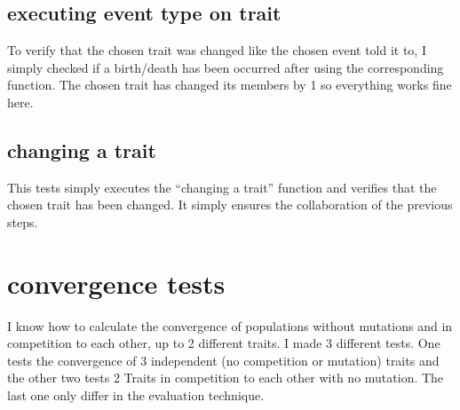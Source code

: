 \documentclass{article}
\begin{document}
\subsection{executing event type on trait}
To verify that the chosen trait was changed like the chosen event told it to, I simply checked if a birth/death has been occurred after using the corresponding function. The chosen trait has changed its members by 1 so everything works fine here.

\subsection{changing a trait}
This tests simply executes the "`changing a trait"' function and verifies that the chosen trait has been changed. It simply ensures the collaboration of the previous steps.

\section{convergence tests}
I know how to calculate the convergence of populations without mutations and in competition to each other, up to 2 different traits. I made 3 different tests. One tests the convergence of 3 independent (no competition or mutation) traits and the other two tests 2 Traits in competition to each other with no mutation. The last one only differ in the evaluation technique.
\end{document}
